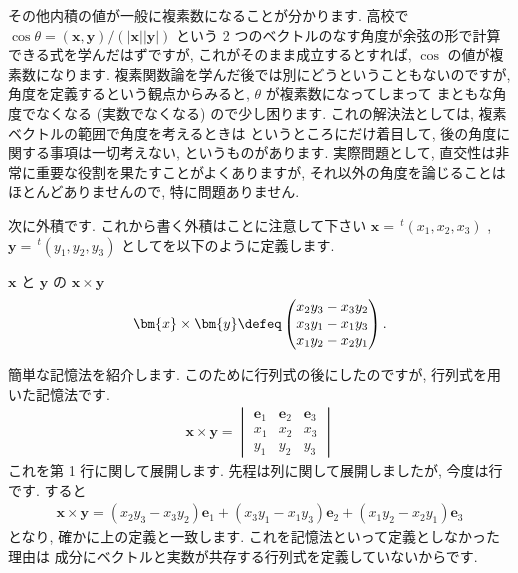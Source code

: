 \documentclass[openany, a4paper, oneside]{jsbook}
\begin{document}
その他内積の値が一般に複素数になることが分かります.
高校で
$\cos \theta = ( \bm{x} , \bm{y} ) / ( | \bm{x} | | \bm{y} | )$
という 2 つのベクトルのなす角度が余弦の形で計算できる式を学んだはずですが,
これがそのまま成立するとすれば,  $\cos$ の値が複素数になります.
複素関数論を学んだ後では別にどうということもないのですが,
角度を定義するという観点からみると,  $\theta$ が複素数になってしまって
まともな角度でなくなる (実数でなくなる) ので少し困ります.
これの解決法としては, 複素ベクトルの範囲で角度を考えるときは
というところにだけ着目して,
後の角度に関する事項は一切考えない, というものがあります.
実際問題として, 直交性は非常に重要な役割を果たすことがよくありますが,
それ以外の角度を論じることはほとんどありませんので, 特に問題ありません.

次に外積です. これから書く外積はことに注意して下さい
$\bm{x}=\, ^{t}(x_{1},x_{2},x_{3})$ ,  $\bm{y}=\, ^t (y_{1},y_{2},y_{3})$ としてを以下のように定義します.
\begin{defn} $\bm{x}$ と $\bm{y}$ の $\bm{x} \times \bm{y}$
\begin{align}
\bm{x} \times \bm{y} \defeq \begin{pmatrix} x_{2}y_{3} - x_{3}y_{2} \\
x_{3}y_{1} - x_{1}y_{3} \\
x_{1}y_{2} - x_{2}y_{1}
\end{pmatrix}.
\end{align}
\end{defn}
簡単な記憶法を紹介します. このために行列式の後にしたのですが, 行列式を用いた記憶法です.
\begin{align}
 \bm{x} \times \bm{y}
 =
 \begin{vmatrix}
   \bm{e}_{1} & \bm{e}_{2} & \bm{e}_{3} \\
   x_{1} & x_{2} & x_{3} \\
   y_{1} & y_{2} & y_{3}
 \end{vmatrix}
\end{align}
これを第 1 行に関して展開します. 先程は列に関して展開しましたが, 今度は行です. すると
\begin{align}
 \bm{x} \times \bm{y}
 =
 (x_{2}y_{3} - x_{3}y_{2})\bm{e}_{1}
 +(x_{3}y_{1} - x_{1}y_{3}) \bm{e}_{2}
 +(x_{1}y_{2} - x_{2}y_{1}) \bm{e}_{3}
\end{align}
となり, 確かに上の定義と一致します. これを記憶法といって定義としなかった理由は
成分にベクトルと実数が共存する行列式を定義していないからです.
\end{document}
